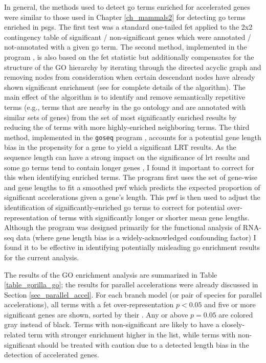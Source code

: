 In general, the methods used to detect \ac{go} terms enriched for
accelerated genes were similar to those used in Chapter
\ref{ch_mammals2} for detecting \ac{go} terms enriched in
\acp{psg}. The first test was a standard one-tailed \ac{fet} applied
to the 2x2 contingency table of significant / non-significant genes
which were annotated / not-annotated with a given \ac{go} term. The
second method, implemented in the \topgo program \citep{Alexa2006a},
is also based on the \ac{fet} statistic but additionally compensates
for the structure of the GO hierarchy by iterating through the
directed acyclic graph and removing nodes from consideration when
certain descendant nodes have already shown significant enrichment
(see \citet{Alexa2006a} for complete details of the algorithm). The
main effect of the \topgo algorithm is to identify and remove
semantically repetitive terms (e.g., terms that are nearby in the
\ac{go} ontology and are annotated with similar sets of genes) from
the set of most significantly enriched results by reducing the \pvs of
terms with more highly-enriched neighboring terms. The third method,
implemented in the \texttt{goseq} program \citep{Young2010a}, accounts
for a potential gene length bias in the propensity for a gene to yield
a significant LRT results. As the sequence length can have a strong
impact on the significance of \ac{lrt} results \citep{Anisimova2001}
and some \ac{go} terms tend to contain longer genes
\citep{Young2010a}, I found it important to correct for this when
identifying enriched terms. The \goseq program first uses the set of
gene-wise \pvs and gene lengths to fit a smoothed \ac{pwf} which
predicts the expected proportion of significant accelerations given a
gene's length. This \ac{pwf} is then used to adjust the identification
of significantly-enriched \ac{go} terms to correct for potential
over-representation of terms with significantly longer or shorter mean
gene lengths. Although the \goseq program was designed primarily for
the functional analysis of RNA-seq data (where gene length bias is a
widely-acknowledged confounding factor) I found it to be effective in
identifying potentially misleading \ac{go} enrichment results for the
current analysis.

The results of the GO enrichment analysis are summarized in Table
\ref{table_gorilla_go}; the results for parallel accelerations were
already discussed in Section \ref{sec_parallel_accel}. For each branch
model (or pair of species for parallel accelerations), all terms with
a \ac{fet} over-representation $p<0.05$ and five or more significant
genes are shown, sorted by their \topgo \pv. Any \topgo or \goseq \pvs
above $p=0.05$ are colored gray instead of black. Terms with
non-significant \topgo \pvs are likely to have a closely-related term
with stronger enrichment higher in the list, while terms with
non-significant \goseq \pvs should be treated with caution due to a
detected length bias in the detection of accelerated genes.

